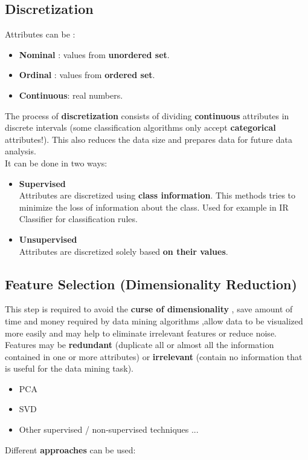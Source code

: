 \subsection{Discretization}
Attributes can be :
\begin{itemize}
\item \textbf{Nominal} : values from \textbf{unordered set}.
\item \textbf{Ordinal} : values from \textbf{ordered set}.
\item \textbf{Continuous}: real numbers.
\end{itemize}
The process of \textbf{discretization} consists of dividing \textbf{continuous} attributes in discrete intervals (some classification algorithms only accept \textbf{categorical} attributes!). This also reduces the data size and prepares data for future data analysis.\\
It can be done in two ways:
\begin{itemize}
\item \textbf{Supervised}\\
Attributes are discretized using \textbf{class information}. This methods tries to minimize the loss of information about the class. Used for example in IR Classifier for classification rules. 
\item \textbf{Unsupervised}\\
Attributes are discretized solely based \textbf{on their values}.
\end{itemize}

\subsection{Feature Selection (Dimensionality Reduction)}
This step is required to avoid the \textbf{curse of dimensionality} , save amount of time and money required by data mining algorithms ,allow data to be visualized more easily and may help to eliminate irrelevant features or reduce noise.\\
Features may be \textbf{redundant} (duplicate all or almost all the information contained in one or more attributes) or \textbf{irrelevant} (contain no information that is useful for the data mining task).
\begin{itemize}
\item PCA
\item SVD
\item Other supervised / non-supervised techniques ...
\end{itemize}
Different \textbf{approaches} can be used:

